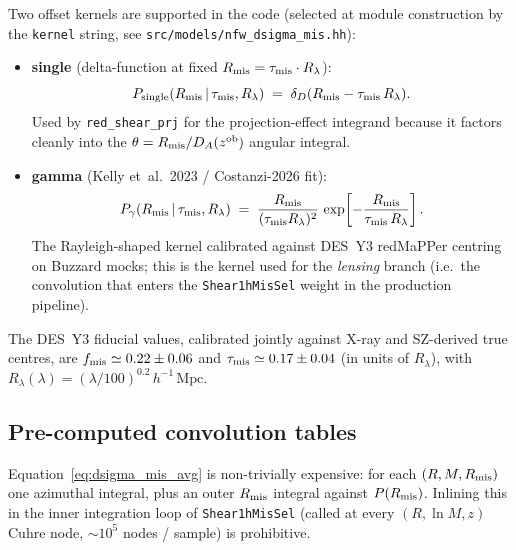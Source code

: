 \documentclass[a4paper, 11pt]{article}
\newcommand{\zob}{z^{\rm ob}}
\newcommand{\hMpc}{h^{-1}\,\mathrm{Mpc}}
\newcommand{\modname}[1]{\textcolor{kwcol}{\texttt{#1}}}
\newcommand{\pyfile}[1]{{\small\texttt{#1}}}
\begin{document}
Two offset kernels are supported in the code (selected at module
construction by the \texttt{kernel} string, see
\pyfile{src/models/nfw\_dsigma\_mis.hh}):
\begin{itemize}
  \setlength\itemsep{2pt}
  \item \textbf{single} (delta-function at fixed $R_{\rm mis} = \tau_{\rm mis} \cdot R_\lambda$):
    \begin{equation}
      P_{\rm single}(R_{\rm mis} \,|\, \tau_{\rm mis}, R_\lambda)
        \;=\; \delta_D(R_{\rm mis} - \tau_{\rm mis}\,R_\lambda).
    \end{equation}
    Used by \modname{red\_shear\_prj} for the projection-effect
    integrand because it factors cleanly into the
    $\theta = R_{\rm mis}/D_A(\zob)$ angular integral.
  \item \textbf{gamma} (Kelly et~al.\ 2023 / Costanzi-2026 fit):
    \begin{equation}
      P_\gamma(R_{\rm mis} \,|\, \tau_{\rm mis}, R_\lambda)
        \;=\; \frac{R_{\rm mis}}{(\tau_{\rm mis} R_\lambda)^2}\,
              \exp\!\left[-\frac{R_{\rm mis}}{\tau_{\rm mis}\,R_\lambda}\right].
    \end{equation}
    The Rayleigh-shaped kernel calibrated against DES~Y3 redMaPPer
    centring on Buzzard mocks; this is the kernel used for the
    \emph{lensing} branch (i.e.\ the convolution that enters the
    \modname{Shear1hMisSel} weight in the production pipeline).
\end{itemize}

The DES~Y3 fiducial values, calibrated jointly against X-ray and
SZ-derived true centres, are
$f_{\rm mis} \simeq 0.22 \pm 0.06$ and
$\tau_{\rm mis} \simeq 0.17 \pm 0.04$ (in units of $R_\lambda$), with
$R_\lambda(\lambda) = (\lambda/100)^{0.2}\,\hMpc$.

\subsection{Pre-computed convolution tables}

Equation~\eqref{eq:dsigma_mis_avg} is non-trivially expensive: for each
$(R, M, R_{\rm mis})$ one azimuthal integral, plus an outer
$R_{\rm mis}$ integral against $P(R_{\rm mis})$.  Inlining this in the
inner integration loop of \modname{Shear1hMisSel} (called at every
$(R, \ln M, z)$ Cuhre node, $\sim 10^5$ nodes / sample) is prohibitive.
\end{document}
